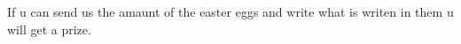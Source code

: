 If u can send us the amaunt of the easter eggs and write what is writen in them u will get a prize.
